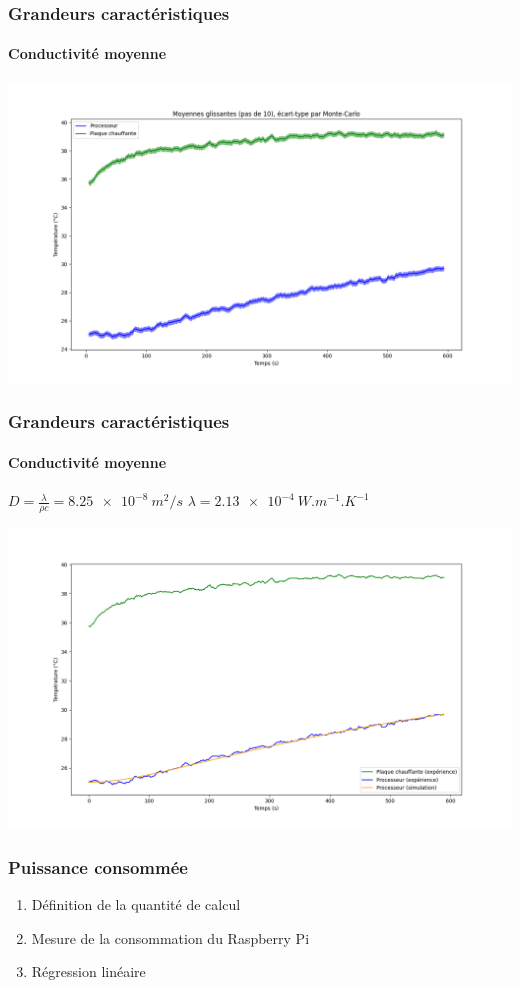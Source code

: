 \documentclass[a4paper,11pt]{beamer}
\begin{document}
\begin{frame}
    \frametitle{Grandeurs caractéristiques}
    \framesubtitle{Conductivité moyenne}

    \includegraphics[width=\textwidth]{moyennes_glissantes_monte_carlo.png}
\end{frame}

\begin{frame}
    \frametitle{Grandeurs caractéristiques}
    \framesubtitle{Conductivité moyenne}

    $D = \frac{\lambda}{\rho c} = \SI{8.25e-8}{m^2/s}$ \hfill $\lambda = \SI{2.13e-4}{W.m^{-1}.K^{-1}}$

    \includegraphics[width=\textwidth]{d_simulation.png}
\end{frame}

\begin{frame}
    \frametitle{Puissance consommée}

    \begin{enumerate}
        \item Définition de la quantité de calcul
        \item Mesure de la consommation du Raspberry Pi
        \item Régression linéaire
    \end{enumerate}
\end{frame}
\end{document}
